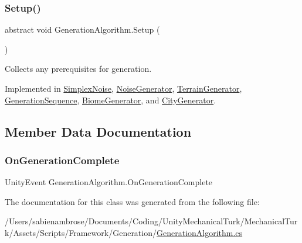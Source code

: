 \mbox{\label{class_generation_algorithm_a5e891b08f0c1d8f4ccc9ad06667691ec}} 
\subsubsection{\texorpdfstring{Setup()}{Setup()}}
{\footnotesize\ttfamily abstract void Generation\+Algorithm.\+Setup (\begin{DoxyParamCaption}{ }\end{DoxyParamCaption})\hspace{0.3cm}{\ttfamily [pure virtual]}}



Collects any prerequisites for generation. 



Implemented in \mbox{\hyperlink{class_simplex_noise_a43164ec5960921789ce75e83651717cf}{Simplex\+Noise}}, \mbox{\hyperlink{class_noise_generator_ad87355d424b537a1a4065d525ec18400}{Noise\+Generator}}, \mbox{\hyperlink{class_terrain_generator_ada250260b370382c1ba5cad243a67f10}{Terrain\+Generator}}, \mbox{\hyperlink{class_generation_sequence_ad433bd211eb9ed7e39d6e354c40289ff}{Generation\+Sequence}}, \mbox{\hyperlink{class_biome_generator_aa1df38909c58ff7112ebfd285e65f6c0}{Biome\+Generator}}, and \mbox{\hyperlink{class_city_generator_a1b17b4a2ea1d8a4cc1b320829da286ae}{City\+Generator}}.



\subsection{Member Data Documentation}
\mbox{\label{class_generation_algorithm_a2f1af71393895b242a38b22e9e69b295}} 
\subsubsection{\texorpdfstring{On\+Generation\+Complete}{OnGenerationComplete}}
{\footnotesize\ttfamily Unity\+Event Generation\+Algorithm.\+On\+Generation\+Complete}



The documentation for this class was generated from the following file\+:\begin{DoxyCompactItemize}
\item 
/\+Users/sabienambrose/\+Documents/\+Coding/\+Unity\+Mechanical\+Turk/\+Mechanical\+Turk/\+Assets/\+Scripts/\+Framework/\+Generation/\mbox{\hyperlink{_generation_algorithm_8cs}{Generation\+Algorithm.\+cs}}\end{DoxyCompactItemize}
